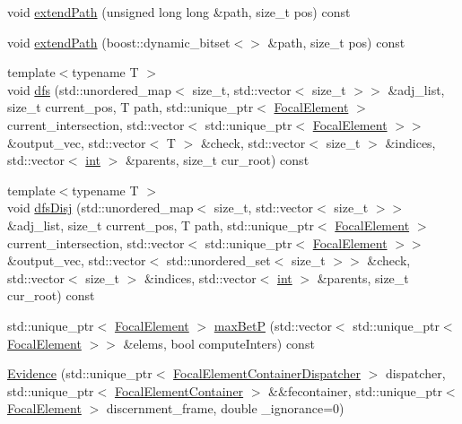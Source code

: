 \begin{DoxyCompactItemize}
\item 
void \hyperlink{classEvidence_a3d0206e5bbb6e8e61ad766c43d6e9113}{extend\+Path} (unsigned long long \&path, size\+\_\+t pos) const 
\item 
void \hyperlink{classEvidence_ae732467027722ccd1a3bd690110e21a3}{extend\+Path} (boost\+::dynamic\+\_\+bitset$<$$>$ \&path, size\+\_\+t pos) const 
\item 
{\footnotesize template$<$typename T $>$ }\\void \hyperlink{classEvidence_aaf90200d5b72268052a4c3df429b1932}{dfs} (std\+::unordered\+\_\+map$<$ size\+\_\+t, std\+::vector$<$ size\+\_\+t $>$$>$ \&adj\+\_\+list, size\+\_\+t current\+\_\+pos, T path, std\+::unique\+\_\+ptr$<$ \hyperlink{classFocalElement}{Focal\+Element} $>$ current\+\_\+intersection, std\+::vector$<$ std\+::unique\+\_\+ptr$<$ \hyperlink{classFocalElement}{Focal\+Element} $>$$>$ \&output\+\_\+vec, std\+::vector$<$ T $>$ \&check, std\+::vector$<$ size\+\_\+t $>$ \&indices, std\+::vector$<$ \hyperlink{CMakeCache_8txt_a79a3d8790b2588b09777910863574e09}{int} $>$ \&parents, size\+\_\+t cur\+\_\+root) const 
\item 
{\footnotesize template$<$typename T $>$ }\\void \hyperlink{classEvidence_af782e3c907c074e903fcda7456265454}{dfs\+Disj} (std\+::unordered\+\_\+map$<$ size\+\_\+t, std\+::vector$<$ size\+\_\+t $>$$>$ \&adj\+\_\+list, size\+\_\+t current\+\_\+pos, T path, std\+::unique\+\_\+ptr$<$ \hyperlink{classFocalElement}{Focal\+Element} $>$ current\+\_\+intersection, std\+::vector$<$ std\+::unique\+\_\+ptr$<$ \hyperlink{classFocalElement}{Focal\+Element} $>$$>$ \&output\+\_\+vec, std\+::vector$<$ std\+::unordered\+\_\+set$<$ size\+\_\+t $>$$>$ \&check, std\+::vector$<$ size\+\_\+t $>$ \&indices, std\+::vector$<$ \hyperlink{CMakeCache_8txt_a79a3d8790b2588b09777910863574e09}{int} $>$ \&parents, size\+\_\+t cur\+\_\+root) const 
\item 
std\+::unique\+\_\+ptr$<$ \hyperlink{classFocalElement}{Focal\+Element} $>$ \hyperlink{classEvidence_aa2580207b322e297cdd0c3af07ddcd21}{max\+BetP} (std\+::vector$<$ std\+::unique\+\_\+ptr$<$ \hyperlink{classFocalElement}{Focal\+Element} $>$$>$ \&elems, bool compute\+Inters) const 
\item 
\hyperlink{classEvidence_a8136cd1d58c59e4b6a5088e9ac581797}{Evidence} (std\+::unique\+\_\+ptr$<$ \hyperlink{classFocalElementContainerDispatcher}{Focal\+Element\+Container\+Dispatcher} $>$ dispatcher, std\+::unique\+\_\+ptr$<$ \hyperlink{classFocalElementContainer}{Focal\+Element\+Container} $>$ \&\&fecontainer, std\+::unique\+\_\+ptr$<$ \hyperlink{classFocalElement}{Focal\+Element} $>$ discernment\+\_\+frame, double \+\_\+ignorance=0)
\end{DoxyCompactItemize}


